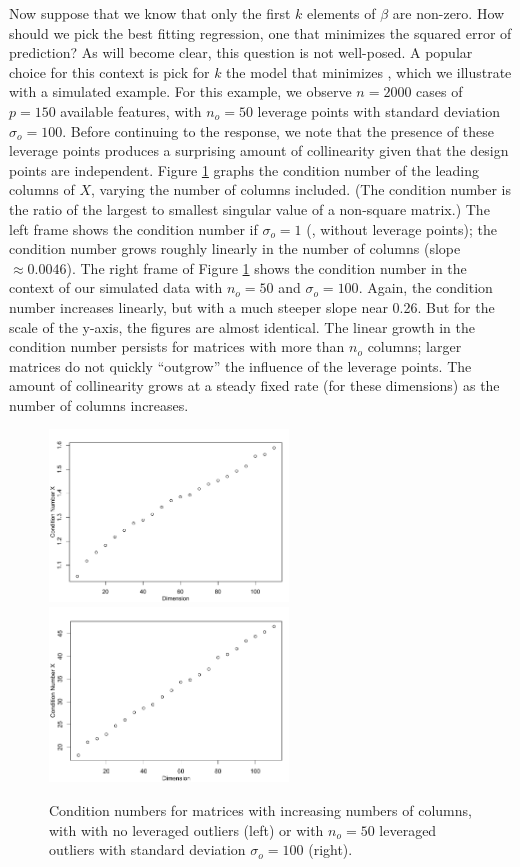 \documentclass[12pt]{article}
\begin{document}
 Now suppose that we know that only the first $k$ elements of $\beta$ are
 non-zero.  How should we pick the best fitting regression, one that minimizes
 the squared error of prediction?  As will become clear, this question is not
 well-posed.  A popular choice for this context is pick for $k$ the model that
 minimizes \aic, which we illustrate with a simulated example.  For this
 example, we observe $n = 2000$ cases of $p = 150$ available features, with
 $n_o=50$ leverage points with standard deviation $\sigma_o = 100$.  Before
 continuing to the response, we note that the presence of these leverage points
 produces a surprising amount of collinearity given that the design points are
 independent.  Figure \ref{fig:cn} graphs the condition number of the leading
 columns of $X$, varying the number of columns included.  (The condition number
 is the ratio of the largest to smallest singular value of a non-square matrix.)
  The left frame shows the condition number if $\sigma_o = 1$ (\ie, without
 leverage points); the condition number grows roughly linearly in the number of
 columns (slope $\approx 0.0046$).  The right frame of Figure \ref{fig:cn} shows
 the condition number in the context of our simulated data with $n_o = 50$ and
 $\sigma_o = 100$.  Again, the condition number increases linearly, but with a
 much steeper slope near 0.26.  But for the scale of the y-axis, the figures are
 almost identical.  The linear growth in the condition number persists for
 matrices with more than $n_o$ columns; larger matrices do not quickly
 ``outgrow'' the influence of the leverage points.  The amount of collinearity
 grows at a steady fixed rate (for these dimensions) as the number of columns
 increases.

 \begin{figure}
 \caption{ Condition numbers for matrices with increasing numbers of columns,
 with with no leveraged outliers (left) or with $n_o=50$ leveraged outliers with
 standard deviation $\sigma_o=100$ (right). } 
 \label{fig:cn}
 \centerline{\includegraphics[width=2.5in]{figures/leverage/cn1.pdf}
             \includegraphics[width=2.5in]{figures/leverage/cn100.pdf}}
 \end{figure}
\end{document}
